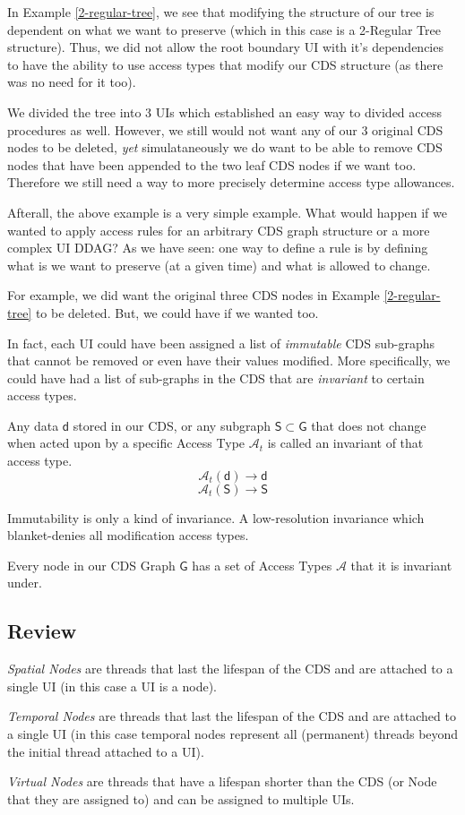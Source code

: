 In Example \ref{2-regular-tree}, we see that modifying the structure of our tree is dependent on what we want to preserve (which in this case is a 2-Regular Tree structure). Thus, we did not allow the root boundary UI with it's dependencies to have the ability to use access types that modify our CDS structure (as there was no need for it too).

We divided the tree into 3 UIs which established an easy way to divided access procedures as well. However, we still would not want any of our 3 original CDS nodes to be deleted, \textit{yet} simulataneously we do want to be able to remove CDS nodes that have been appended to the two leaf CDS nodes if we want too. Therefore we still need a way to more precisely determine access type allowances.

Afterall, the above example is a very simple example. What would happen if we wanted to apply access rules for an arbitrary CDS graph structure or a more complex UI DDAG? As we have seen: one way to define a rule is by defining what is we want to preserve (at a given time) and what is allowed to change.

For example, we did want the original three CDS nodes in Example \ref{2-regular-tree} to be deleted. But, we could have if we wanted too.

In fact, each UI could have been assigned a list of \textit{immutable} CDS sub-graphs that cannot be removed or even have their values modified. More specifically, we could have had a list of sub-graphs in the CDS that are \textit{invariant} to certain access types.

\begin{con-def}[Invariants]
	\label{invariants}
	Any data $\mathsf{d}$ stored in our CDS, or any subgraph $\mathsf{S} \subset \mathsf{G}$ that does not change when acted upon by a specific Access Type $\mathcal{A}_{t}$ is called an invariant of that access type.
	\[ \mathcal{A}_{t}\mathsf{(d)} \rightarrow \mathsf{d} \]
	\[ \mathcal{A}_{t}\mathsf{(S)} \rightarrow \mathsf{S} \]
\end{con-def}

\begin{con-aside}
Immutability is only a kind of invariance. A low-resolution invariance which blanket-denies all modification access types.
\end{con-aside}

Every node in our CDS Graph $\mathsf{G}$ has a set of Access Types $\mathcal{A}$ that it is invariant under.

\subsection{Review}

\textit{Spatial Nodes} are threads that last the lifespan of the CDS and are attached to a single UI (in this case a UI is a node).

\textit{Temporal Nodes} are threads that last the lifespan of the CDS and are attached to a single UI (in this case temporal nodes represent all (permanent) threads beyond the initial thread attached to a UI).

\textit{Virtual Nodes} are threads that have a lifespan shorter than the CDS (or Node that they are assigned to) and can be assigned to multiple UIs.